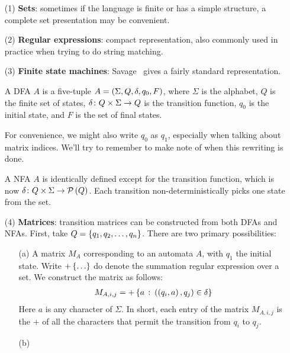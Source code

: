 \begin{enumerate}
  \item[(1)]
    \textbf{Sets}:
    sometimes if the language is finite or has a simple structure,
    a complete set presentation may be convenient.

  \item[(2)]
    \textbf{Regular expressions}:
    compact representation,
    also commonly used in practice when trying to do string matching.

  \item[(3)]
    \textbf{Finite state machines}:
    Savage~\cite{savage1998models} gives a fairly standard representation.

    \begin{definition}[DFA]
      A DFA \(A\) is a five-tuple \(A = \left(\Sigma, Q, \delta, q_0, F\right)\),
      where \(\Sigma\) is the alphabet, \(Q\) is the finite set of states,
      \(\delta \colon Q \times \Sigma \to Q\) is the transition function,
      \(q_0\) is the initial state, and \(F\) is the set of final states.
    \end{definition}

    For convenience, we might also write \(q_0\) as \(q_1\),
    especially when talking about matrix indices.
    We'll try to remember to make note of when this rewriting is done.

    \begin{definition}[NFA]
      A NFA \(A\) is identically defined except for the
      transition function, which is now
      \(\delta \colon Q \times \Sigma \to \mathcal{P}\left(Q\right)\).
      Each transition non-deterministically picks one state from the set.
    \end{definition}

  \item[(4)]
    \textbf{Matrices}:
    transition matrices can be constructed from both DFAs and NFAs.
    First, take \(Q = \left\{q_1, q_2, \ldots, q_n\right\}\).
    There are two primary possibilities:

    \begin{enumerate}
      \item[(a)]
        A matrix \(M_A\) corresponding to an automata \(A\),
        with \(q_1\) the initial state.
        Write \(+\left\{\ldots\right\}\) do denote
        the summation regular expression over a set.
        We construct the matrix as follows:
        \begin{align*}
          M_{A, i, j} =
            + \left\{a \ \colon \left(\left(q_i, a\right), q_j\right) \in \delta\right\}
        \end{align*}
        Here \(a\) is any character of \(\Sigma\).
        In short, each entry of the matrix \(M_{A, i, j}\)
        is the \(+\) of all the characters
        that permit the transition from \(q_i\) to \(q_j\).


      \item[(b)]
    \end{enumerate}

\end{enumerate}


